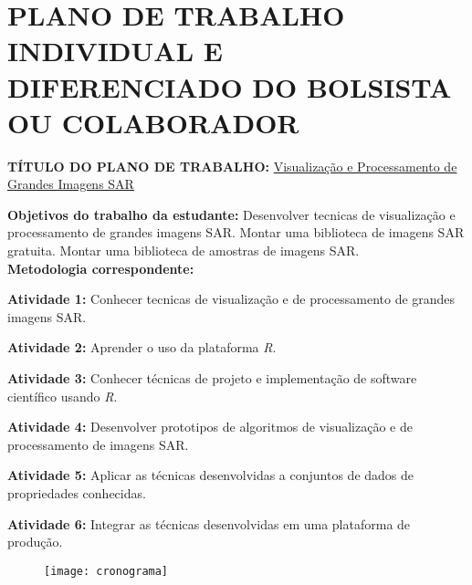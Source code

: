 \documentclass[12pt,letterpaper]{article}
\begin{document}
  \newpage




  
  \newpage

\section*{\centering \textbf{PLANO DE TRABALHO INDIVIDUAL E DIFERENCIADO DO BOLSISTA OU COLABORADOR}} %

\textbf{TÍTULO DO PLANO DE TRABALHO:} \underline{Visualização e Processamento de Grandes Imagens SAR}

\textbf{Objetivos do trabalho da estudante:} Desenvolver tecnicas de visualização e processamento de grandes imagens SAR. Montar uma biblioteca de imagens SAR gratuita. Montar uma biblioteca de amostras de imagens SAR.\\

\textbf{Metodologia correspondente:}

\textbf{Atividade 1:} Conhecer tecnicas de visualização e de processamento de grandes imagens SAR.

\textbf{Atividade 2:} Aprender o uso da plataforma \textit{R}.

\textbf{Atividade 3:} Conhecer técnicas de projeto e implementação de software científico usando \textit{R}.

\textbf{Atividade 4:} Desenvolver prototipos de algoritmos de visualização e de processamento de imagens SAR.

\textbf{Atividade 5:} Aplicar as técnicas desenvolvidas a conjuntos de dados de propriedades conhecidas.

\textbf{Atividade 6:} Integrar as técnicas desenvolvidas em uma plataforma de produção.\\

\begin{figure}[H]
\begin{center}
\texttt{[image: cronograma]}
\end{center}
\end{figure}
\end{document}

